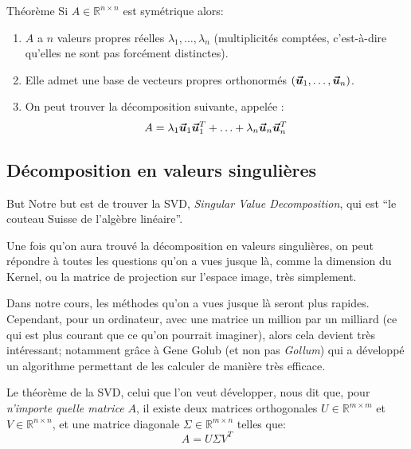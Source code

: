 \documentclass[a4paper]{article}
\begin{document}
\begin{parag}{Théorème}
    Si $A \in \mathbb{R}^{n\times n}$ est symétrique alors:
    \begin{enumerate}
        \item $A$ a $n$ valeurs propres réelles $\lambda_1, \ldots, \lambda_n$ (multiplicités comptées, c'est-à-dire qu'elles ne sont pas forcément distinctes).
        \item Elle admet une base de vecteurs propres orthonormés $\left(\bvec{u}_1, \ldots, \bvec{u}_n\right)$.
        \item On peut trouver la décomposition suivante, appelée :
        \[A = \lambda_1 \bm{\protect\vec{u}}_1 \bm{\protect\vec{u}}_1^T + \ldots + \lambda_n \bm{\protect\vec{u}}_n \bm{\protect\vec{u}}_n^T\]
    \end{enumerate}
\end{parag}

\subsection{Décomposition en valeurs singulières}
\begin{parag}{But}
    Notre but est de trouver la SVD, \textit{Singular Value Decomposition}, qui est ``le couteau Suisse de l'algèbre linéaire''.

    Une fois qu'on aura trouvé la décomposition en valeurs singulières, on peut répondre à toutes les questions qu'on a vues jusque là, comme la dimension du Kernel, ou la matrice de projection sur l'espace image, très simplement.

    Dans notre cours, les méthodes qu'on a vues jusque là seront plus rapides. Cependant, pour un ordinateur, avec une matrice un million par un milliard (ce qui est plus courant que ce qu'on pourrait imaginer), alors cela devient très intéressant; notamment grâce à Gene Golub (et non pas \textit{Gollum}) qui a développé un algorithme permettant de les calculer de manière très efficace.

    Le théorème de la SVD, celui que l'on veut développer, nous dit que, pour \textit{n'importe quelle matrice} $A$, il existe deux matrices orthogonales $U \in \mathbb{R}^{m \times m}$ et $V \in \mathbb{R}^{n \times n}$, et une matrice diagonale $\Sigma \in \mathbb{R}^{m \times n}$ telles que:
    \[A = U \Sigma V^T\]
\end{parag}
\end{document}
